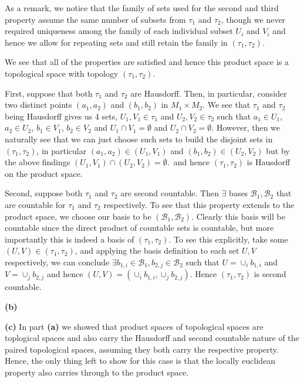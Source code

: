 \documentclass[10pt]{article}
\begin{document}
As a remark, we notice that the family of sets used for the second and third property assume the same number of subsets from $\tau_{1}$ and $\tau_{2}$, though we never required uniqueness among the family of each individual subset $U_{i}$ and $V_{i}$ and hence we allow for repeating sets and still retain the family in $(\tau_{1},\tau_{2})$.

We see that all of the properties are satisfied and hence this product space is a topological space with topology $(\tau_{1},\tau_{2})$. 

First, suppose that both $\tau_{1}$ and $\tau_{2}$ are Hausdorff. Then, in particular, consider two distinct points $(a_{1},a_{2})$ and $(b_{1},b_{2})$ in $M_{1} \times M_{2}$. We see that $\tau_{1}$ and $\tau_{2}$ being Hausdorff gives us 4 sets, $U_{1},V_{1} \in \tau_{1}$ and $U_{2},V_{2}\in \tau_{2}$ such that $a_{1}\in U_{1}$, $a_{2} \in U_{2}$, $b_{1} \in V_{1}$, $b_{2} \in V_{2}$ and $U_{1}\cap V_{1} = \emptyset$ and $U_{2}\cap V_{2} = \emptyset$. However, then we naturally see that we can just choose such sets to build the disjoint sets in $(\tau_{1},\tau_{2})$, in particular $(a_{1},a_{2}) \in (U_{1},V_{1})$ and $(b_{1},b_{2}) \in (U_{2}, V_{2})$ but by the above findings $(U_{1},V_{1}) \cap (U_{2}, V_{2}) = \emptyset$.\, and hence $(\tau_{1},\tau_{2})$ is Hausdorff on the product space.

Second, suppose both $\tau_{1}$ and $\tau_{2}$ are second countable. Then $\exists$ bases $\mathcal{B}_{1},\mathcal{B}_{2}$ that are countable for $\tau_{1}$ and $\tau_{2}$ respectively. To see that this property extends to the product space, we choose our basis to be $(\mathcal{B}_{1},\mathcal{B}_{2})$. Clearly this basis will be countable since the direct product of countable sets is countable, but more importantly this is indeed a basis of $(\tau_{1},\tau_{2})$. To see this explicitly, take some $(U,V)\in (\tau_{1},\tau_{2})$, and applying the basis definition to each set $U,V$ respectively, we can conclude $\exists b_{1,i}\in \mathcal{B}_{1},b_{2,j}\in\mathcal{B}_{2}$ such that $U = \cup_{i}b_{1,i}$ and $V = \cup_{j}b_{2,j}$ and hence $(U,V) = (\cup_{i}b_{1,i},\cup_{j}b_{2,j})$. Hence $(\tau_{1},\tau_{2})$ is second countable.

\textbf{(b)} 

\textbf{(c)} In part \textbf{(a)} we showed that product spaces of topological spaces are toplogical spaces and also carry the Hausdorff and second countable nature of the paired topological spaces, assuming they both carry the respective property. Hence, the only thing left to show for this case is that the locally euclidean property also carries through to the product space.
\end{document}

